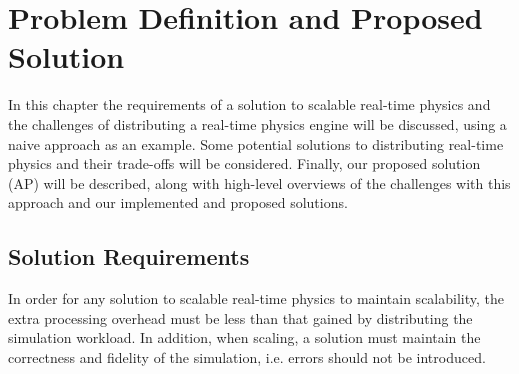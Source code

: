 \chapter{Problem Definition and Proposed Solution}\label{ProbDef}

In this chapter the requirements of a solution to scalable real-time physics and the challenges of distributing a real-time physics engine will be discussed, using a naive approach as an example. Some potential solutions to distributing real-time physics and their trade-offs will be considered. Finally, our proposed solution (AP) will be described, along with high-level overviews of the challenges with this approach and our implemented and proposed solutions.

\section{Solution Requirements}

In order for any solution to scalable real-time physics to maintain scalability, the extra processing overhead must be less than that gained by distributing the simulation workload. In addition, when scaling, a solution must maintain the correctness and fidelity of the simulation, i.e. errors should not be introduced.

